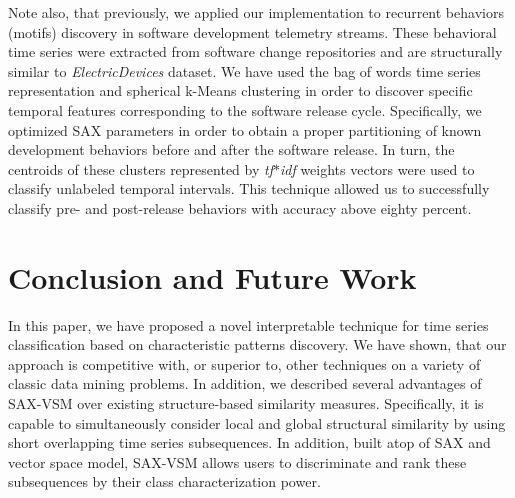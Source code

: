 \documentclass{llncs}
\begin{document}
Note also, that previously, we applied our implementation to recurrent behaviors (motifs) 
discovery in software development telemetry streams\cite{android}. 
These behavioral time series were extracted from software change repositories and are 
structurally similar to \textit{ElectricDevices} dataset. 
We have used the bag of words time series representation and spherical k-Means clustering 
in order to discover specific temporal features corresponding to the software release cycle. 
Specifically, we optimized SAX parameters in order to obtain a proper partitioning of known 
development behaviors before and after the software release. In turn, the centroids of these 
clusters represented by \textit{tf$\ast$idf} weights vectors were used to classify unlabeled  
temporal intervals. This technique allowed us to successfully classify pre- and post-release
behaviors with accuracy above eighty percent.

\section{Conclusion and Future Work}
In this paper, we have proposed a novel interpretable technique for time series classification
based on characteristic patterns discovery. We have shown, that our approach is competitive with, 
or superior to, other techniques on a variety of classic data mining problems. In addition, 
we described several advantages of SAX-VSM over existing structure-based similarity measures.
Specifically, it is capable to simultaneously consider local and global structural similarity by 
using short overlapping time series subsequences. In addition, built atop of SAX and vector space
model, SAX-VSM allows users to discriminate and rank these subsequences by their class 
characterization power.
\end{document}
